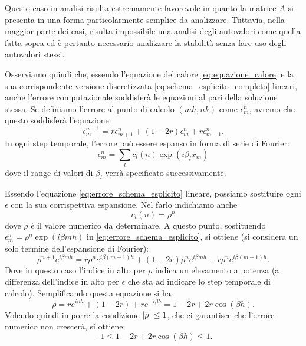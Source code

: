 \documentclass[10pt,a4paper]{article}
\begin{document}
Questo caso in analisi risulta estremamente favorevole in quanto la matrice $A$ si presenta in una forma particolarmente semplice da analizzare. Tuttavia, nella maggior parte dei casi, risulta impossibile una analisi degli autovalori come quella fatta sopra ed è pertanto necessario analizzare la stabilità senza fare uso degli autovalori stessi.

Osserviamo quindi che, essendo l'equazione del calore \eqref{eq:equazione_calore} e la sua corrispondente versione discretizzata \eqref{eq:schema_esplicito_completo} lineari, anche l'errore computazionale soddisferà le equazioni al pari della soluzione stessa. Se definiamo l'errore al punto di calcolo $(mh, nk)$ come $\epsilon_m^n$, avremo che questo soddisferà l'equazione:
\begin{equation}
	\epsilon_m^{n+1} = r \epsilon_{m+1}^n + (1-2r)\epsilon_m^n + r \epsilon_{m-1}^n.
	\label{eq:errore_schema_esplicito}
\end{equation}
In ogni step temporale, l'errore può essere espanso in forma di serie di Fourier:
\begin{equation}
	\epsilon_m^n = \sum_l c_l(n)\exp(i\beta_l x_m)
\end{equation}
dove il range di valori di $\beta_l$ verrà specificato successivamente.

Essendo l'equazione \eqref{eq:errore_schema_esplicito} lineare, possiamo sostituire ogni $\epsilon$ con la sua corrispettiva espansione. Nel farlo indichiamo anche
\begin{equation}
	c_l(n) = \rho^n
\end{equation}
dove $\rho$ è il valore numerico da determinare. A questo punto, sostituendo $\epsilon_m^n = \rho^n \exp(i\beta mh)$ in \eqref{eq:errore_schema_esplicito}, si ottiene (si considera un solo termine dell'espansione di Fourier):
\begin{equation}
	\rho^{n+1} e^{i\beta mh} = r\rho^n e^{i\beta(m+1)h}+(1-2r)\rho^n e^{i\beta mh} + r\rho^n e^{i\beta (m-1)h}.
\end{equation}
Dove in questo caso l'indice in alto per $\rho$ indica un elevamento a potenza (a differenza dell'indice in alto per $\epsilon$ che sta ad indicare lo step temporale di calcolo). Semplificando questa equazione si ha
\begin{equation}
	\rho = r e^{i\beta h}+ (1-2r) + re^{-i\beta h} = 1 - 2r + 2r \cos(\beta h).
\end{equation}
Volendo quindi imporre la condizione $\abs{\rho}\leq 1$, che ci garantisce che l'errore numerico non crescerà, si ottiene:
\begin{equation}
	-1 \leq 1 - 2r + 2r\cos(\beta h) \leq 1.
	\label{eq:fourier_error}
\end{equation}
\end{document}
